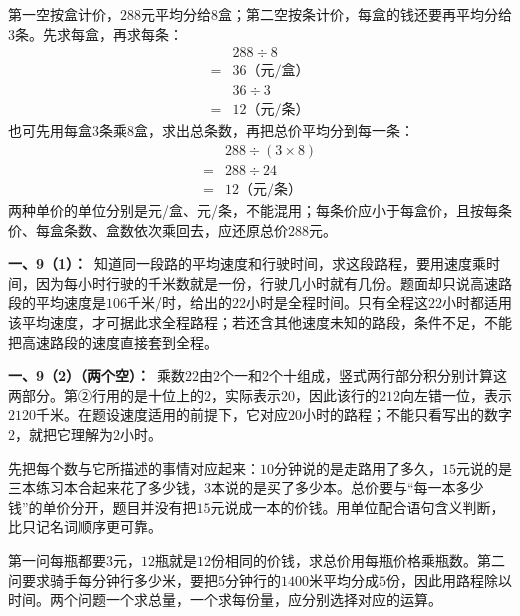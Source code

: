 \documentclass[multi=snippet,border=0pt]{standalone}
\newenvironment{snippet}[3]{\begin{minipage}{#1bp}\color{answerred}\fontsize{#2}{#3}\selectfont\raggedright}{\end{minipage}}
\begin{document}
\begin{snippet}{505}{11.5}{14}第一空按盒计价，\(288\)元平均分给\(8\)盒；第二空按条计价，每盒的钱还要再平均分给\(3\)条。先求每盒，再求每条：\[\begin{aligned}&288\div8\\={}&36\text{（元/盒）}\end{aligned}\]\[\begin{aligned}&36\div3\\={}&12\text{（元/条）}\end{aligned}\]也可先用每盒\(3\)条乘\(8\)盒，求出总条数，再把总价平均分到每一条：\[\begin{aligned}&288\div(3\times8)\\={}&288\div24\\={}&12\text{（元/条）}\end{aligned}\]两种单价的单位分别是元/盒、元/条，不能混用；每条价应小于每盒价，且按每条价、每盒条数、盒数依次乘回去，应还原总价\(288\)元。\end{snippet}
\begin{snippet}{505}{11.5}{14}\textbf{一、9（1）：}\ 知道同一段路的平均速度和行驶时间，求这段路程，要用速度乘时间，因为每小时行驶的千米数就是一份，行驶几小时就有几份。题面却只说高速路段的平均速度是\(106\)千米/时，给出的\(22\)小时是全程时间。只有全程这\(22\)小时都适用该平均速度，才可据此求全程路程；若还含其他速度未知的路段，条件不足，不能把高速路段的速度直接套到全程。\end{snippet}
\begin{snippet}{505}{11.5}{14}\textbf{一、9（2）（两个空）：}\ 乘数\(22\)由\(2\)个一和\(2\)个十组成，竖式两行部分积分别计算这两部分。第②行用的是十位上的\(2\)，实际表示\(20\)，因此该行的\(212\)向左错一位，表示\(2120\)千米。在题设速度适用的前提下，它对应\(20\)小时的路程；不能只看写出的数字\(2\)，就把它理解为\(2\)小时。\end{snippet}
\begin{snippet}{505}{11.5}{14}先把每个数与它所描述的事情对应起来：\(10\)分钟说的是走路用了多久，\(15\)元说的是三本练习本合起来花了多少钱，\(3\)本说的是买了多少本。总价要与“每一本多少钱”的单价分开，题目并没有把\(15\)元说成一本的价钱。用单位配合语句含义判断，比只记名词顺序更可靠。\end{snippet}
\begin{snippet}{505}{11.5}{14}第一问每瓶都要\(3\)元，\(12\)瓶就是\(12\)份相同的价钱，求总价用每瓶价格乘瓶数。第二问要求骑手每分钟行多少米，要把\(5\)分钟行的\(1400\)米平均分成\(5\)份，因此用路程除以时间。两个问题一个求总量，一个求每份量，应分别选择对应的运算。\end{snippet}
\end{document}
